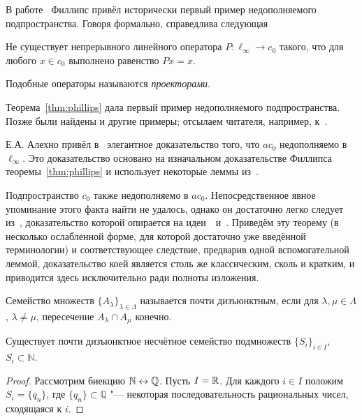 \label{sec:noncomplementarity}

В работе~\cite{phillips1940linear} Филлипс привёл исторически первый пример недополняемого подпространства.
Говоря формально, справедлива следующая


\begin{theorem}
	\label{thm:phillips}
	Не существует непрерывного линейного оператора $P: \ell_\infty \to c_0$ такого, что для любого
	$x \in c_0$ выполнено равенство $Px =x$.
\end{theorem}
Подобные операторы называются \emph{проекторами}.

Теорема~\ref{thm:phillips} дала первый пример недополняемого подпространства.
Позже были найдены и другие примеры;
отсылаем читателя, например, к~\cite{lindenstrauss1979classical}.

Е.А. Алехно привёл в~\cite[теорема 8]{alekhno2006propertiesII} элегантное доказательство
того, что $ac_0$ недополняемо в $\ell_\infty$.
Это доказательство основано на изначальном доказательстве Филлипса теоремы~\ref{thm:phillips}
и использует некоторые леммы из~\cite{phillips1940linear}.

Подпространство $c_0$ также недополняемо в $ac_0$.
Непосредственное явное упоминание этого факта найти не удалось, однако он достаточно легко следует из~\cite[теорема 4]{ASSU2},
доказательство которой опирается на идеи~\cite{whitley1968projecting}~и~\cite[теорема 6.9]{Carothers}.
Приведём эту теорему (в несколько ослабленной форме, для которой достаточно уже введённой терминологии)
и соответствующее следствие, предварив одной вспомогательной леммой, доказательство коей является столь же классическим, сколь и кратким,
и приводится здесь исключительно ради полноты изложения.

\begin{definition}
	Семейство множеств $\{A_\lambda\}_{\lambda \in \Lambda}$ называется почти дизъюнктным,
	если для $\lambda, \mu \in \Lambda$, $\lambda \ne \mu$,
	пересечение $A_\lambda \cap A_\mu$ конечно.
\end{definition}

\begin{lemma}
	\label{lem:uncountable_subsets_of_N_with_finite_intersections}
	Существует почти дизъюнктное несчётное семейство подмножеств $\{S_i\}_{i\in I}$, $S_i \subset \mathbb{N}$.
\end{lemma}

\begin{proof}
	Рассмотрим биекцию $\mathbb{N} \leftrightarrow \mathbb{Q}$.
	Пусть $I = \mathbb{R}$.
	Для каждого $i\in I$ положим $S_i = \{q_n\}$,
	где $\{q_n\} \subset \mathbb{Q}$ "--- некоторая последовательность рациональных чисел,
	сходящаяся к $i$.
\end{proof}

